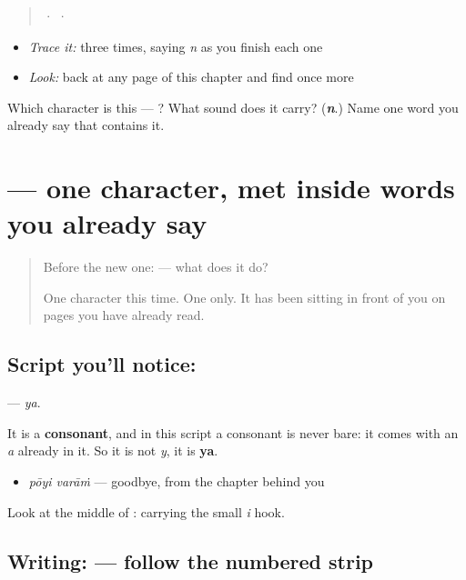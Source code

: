 \begin{quote}
  ·    ·  
\end{quote}

\begin{itemize}
\raggedright
  \item \emph{Trace it:}  three times, saying \emph{n} as you finish each one
  \item \emph{Look:} back at any page of this chapter and find  once more
\end{itemize}

\begin{tcolorbox}[breakable,colback=teal!4,colframe=teal!35!black,title={Before you move on}]
Which character is this — ? What sound does it carry? (\emph{\textbf{n}}.) Name one word you already say that contains it.
\end{tcolorbox}
\section[\texorpdfstring{\ml{യ} (ya)}{യ (ya)}]{ — one character, met inside words you already say}

\label{lesson:ML-S122-letter-ya}



\begin{quote}
Before the new one:  — what does it do?

One character this time. One only. It has been sitting in front of you on pages you have already read.
\end{quote}

\subsection*{Script you'll notice: }
\textbf{} — \emph{ya}.

It is a \textbf{consonant}, and in this script a consonant is never bare: it comes with an \emph{a} already in it. So it is not \emph{y}, it is \textbf{ya}.

\begin{itemize}
\raggedright
  \item \textbf{ } \emph{pōyi varāṁ} — goodbye, from the chapter behind you
\end{itemize}

Look at the middle of \textbf{}: \textbf{} carrying the small \emph{i} hook.

\subsection*{Writing:  — follow the numbered strip}


